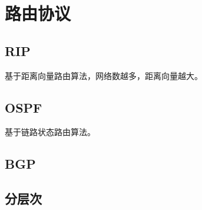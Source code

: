 \section{路由协议}

\subsection{RIP}
基于距离向量路由算法，网络数越多，距离向量越大。


\subsection{OSPF}
基于链路状态路由算法。


\subsection{BGP}


\subsection{分层次}


















































































